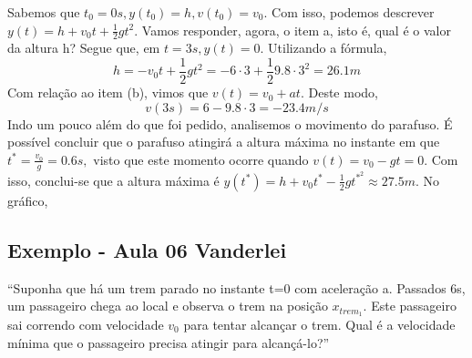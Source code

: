 \documentclass{article}
\begin{document}
Sabemos que $t_{0} = 0s, y(t_{0}) = h, v(t_{0}) = v_{0}.$ Com isso, podemos descrever $y(t) = h + v_{0}t + \frac{1}{2}gt^{2}$. Vamos responder, agora, o item a, isto \'e, qual \'e o valor
da altura h? Segue que, em $t=3s, y(t) = 0$. Utilizando a f\'ormula, 
  $$
    h = -v_{0}t + \frac{1}{2}gt^{2} = -6 \cdot3 + \frac{1}{2}9.8 \cdot 3^{2} = 26.1m
  $$
  Com rela\c c\~ao ao item (b), vimos que $v(t) = v_{0} + at.$ Deste modo, 
    $$
      v(3s) = 6 - 9.8 \cdot 3 = -23.4m/s
    $$
  Indo um pouco al\'em do que foi pedido, analisemos o movimento do parafuso. \'E poss\'ivel concluir que o parafuso atingir\'a a altura 
m\'axima no instante em que $t^{*} = \frac{v_{0}}{g} = 0.6s,$ visto que este momento ocorre quando $v(t) = v_{0} - gt = 0$. Com isso,
conclui-se que a altura m\'axima \'e $y(t^{*}) = h + v_{0}t^{*} - \frac{1}{2}gt^{*^{2}} \approx 27.5m.$ No gr\'afico,
  \begin{center}
\end{center}

\subsection{Exemplo - Aula 06 Vanderlei}
  ``Suponha que h\'a um trem parado no instante t=0 com acelera\c c\~ao a. Passados 6s, um passageiro chega ao local e observa o trem na posi\c c\~ao $x_{trem_{1}}$.
  Este passageiro sai correndo com velocidade $v_{0}$ para tentar alcan\c car o trem. Qual \'e a velocidade m\'inima que o passageiro precisa atingir
  para alcan\c c\'a-lo?''
    
\end{document}
